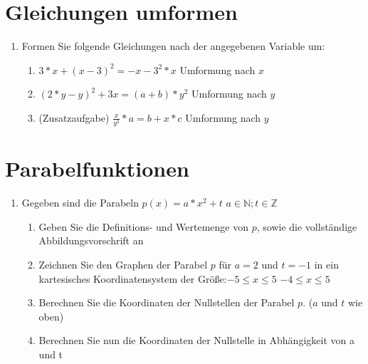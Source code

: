 \documentclass{scrartcl}
\begin{document}
	\section{Gleichungen umformen}
			\begin{enumerate}
				\item Formen Sie folgende Gleichungen nach der angegebenen Variable um:
				\begin{enumerate}
					\item $3*x + (x-3)^2 = -x-3^2*x$ \quad Umformung nach $x$ 
					\item $(2*y-y)^2+3x=(a+b)*y^2$ \quad Umformung nach $y$ 
					\item (Zusatzaufgabe) $\frac{x}{y^2}*a = b+x*c$ \quad Umformung nach $y$\\
				\end{enumerate}
		\end{enumerate} 
	
	\section{Parabelfunktionen}		
		\begin{enumerate}
			\item Gegeben sind die Parabeln $p(x) = a*x^2 + t$ \quad \quad $a \in \mathbb{N}; t \in \mathbb{Z}$
				\begin{enumerate}
					\item Geben Sie die Definitions- und Wertemenge von $p$, sowie die vollständige Abbildungsvorschrift an
					\item Zeichnen Sie den Graphen der Parabel $p$ für $a=2$ und $t = -1$ in ein kartesisches Koordinatensystem der Größe:\quad $ -5 \leq x \leq 5 $ \quad $-4 \leq x \leq 5$ 
					\item Berechnen Sie die Koordinaten der Nullstellen der Parabel $p$. ($a$ und $t$ wie oben)
					\item Berechnen Sie nun die Koordinaten der Nullstelle in Abhängigkeit von a und t \\
				\end{enumerate}	
		\end{enumerate} 
\end{document}
